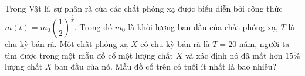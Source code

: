 \begin{ex}%
	Trong Vật lí, sự phân rã của các chất phóng xạ được biểu diễn bởi công thức $m(t)=m_0 \left( \dfrac{1}{2} \right)^{\tfrac{t}{T}} $. Trong đó $m_0 $ là khối lượng ban đầu của chất phóng xạ, $T$ là chu kỳ bán rã. Một chất phóng xạ $X$ có chu kỳ bán rã là $T=20$ năm, người ta tìm được trong  một mẫu đồ cổ một lượng chất $X$ và xác định nó đã mất hơn $15\% $ lượng chất $X$ ban đầu của nó. Mẫu đồ cổ trên có tuổi ít nhất là bao nhiêu?
\end{ex}

